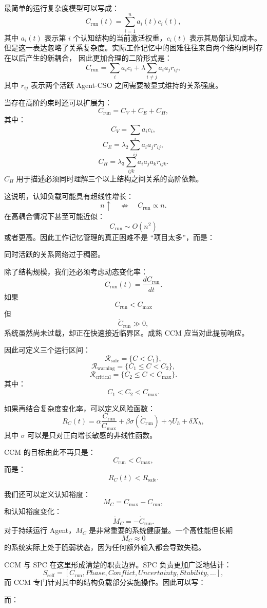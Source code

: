 最简单的运行复杂度模型可以写成：
\[
C_{\mathrm{run}}(t)
=
\sum_{i=1}^{n}
a_i(t)c_i(t),
\]
其中 $a_i(t)$ 表示第 $i$ 个认知结构的当前激活权重，$c_i(t)$ 表示其局部认知成本。
但是这一表达忽略了关系复杂度。实际工作记忆中的困难往往来自两个结构同时存在以后产生的新耦合，
因此更加合理的二阶形式是：
\[
C_{\mathrm{run}}
=
\sum_i a_i c_i
+
\lambda
\sum_{i\neq j}
a_i a_j r_{ij},
\]
其中 $r_{ij}$ 表示两个活跃 Agent-CSO 之间需要被显式维持的关系强度。

当存在高阶约束时还可以扩展为：
\[
C_{\mathrm{run}}
=
C_V
+
C_E
+
C_H,
\]
其中：
\[
C_V=\sum_i a_i c_i,
\]
\[
C_E=\lambda_2\sum_{ij}a_i a_jr_{ij},
\]
\[
C_H=\lambda_3\sum_{ijk}a_i a_j a_k r_{ijk}.
\]
$C_H$ 用于描述必须同时理解三个以上结构之间关系的高阶依赖。

这说明，认知负载可能具有超线性增长：
\[
n\uparrow
\quad\not\Rightarrow\quad
C_{\mathrm{run}}\propto n.
\]
在高耦合情况下甚至可能近似：
\[
C_{\mathrm{run}}\sim O(n^2)
\]
或者更高。因此工作记忆管理的真正困难不是 ``项目太多''，而是：
\begin{statementbox}
同时活跃的关系网络过于稠密。
\end{statementbox}

除了结构规模，我们还必须考虑动态变化率：
\[
\dot C_{\mathrm{run}}(t)
=
\frac{dC_{\mathrm{run}}}{dt}.
\]
如果
\[
C_{\mathrm{run}}<C_{\max}
\]
但
\[
\dot C_{\mathrm{run}}\gg 0,
\]
系统虽然尚未过载，却正在快速接近临界区。成熟 CCM 应当对此提前响应。

因此可定义三个运行区间：
\[
\mathcal R_{\mathrm{safe}}
=
\{C<C_1\},
\]
\[
\mathcal R_{\mathrm{warning}}
=
\{C_1\le C<C_2\},
\]
\[
\mathcal R_{\mathrm{critical}}
=
\{C_2\le C<C_{\max}\}.
\]
其中：
\[
C_1<C_2<C_{\max}.
\]

如果再结合复杂度变化率，可以定义风险函数：
\[
R_C(t)
=
\alpha
\frac{C_{\mathrm{run}}}{C_{\max}}
+
\beta
\sigma(\dot C_{\mathrm{run}})
+
\gamma U_h
+
\delta X_h,
\]
其中 $\sigma$ 可以是只对正向增长敏感的非线性函数。

CCM 的目标由此不再只是：
\[
C_{\mathrm{run}}<C_{\max},
\]
而是：
\[
\boxed{
R_C(t)<R_{\mathrm{safe}}.
}
\]

我们还可以定义认知裕度：
\[
M_C
=
C_{\max}-C_{\mathrm{run}},
\]
和认知裕度变化：
\[
\dot M_C
=
-\dot C_{\mathrm{run}}.
\]
对于持续运行 Agent，$M_C$ 是非常重要的系统健康量。一个高性能但长期
\[
M_C\approx0
\]
的系统实际上处于脆弱状态，因为任何额外输入都会导致失稳。

CCM 与 SPC 在这里形成清楚的职责边界。SPC 负责更加广泛地估计：
\[
S_{\mathrm{self}}
=
[
C_{\mathrm{run}},
Phase,
Conflict,
Uncertainty,
Stability,\ldots
],
\]
而 CCM 专门针对其中的结构负载部分实施操作。因此可以写：
\begin{statementbox}
\centering
{}
\end{statementbox}
而：
\begin{statementbox}
\centering
{}
\end{statementbox}

